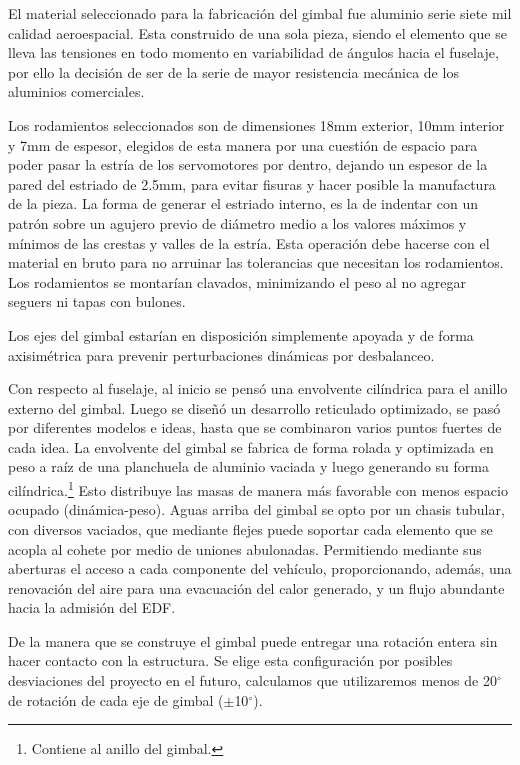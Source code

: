 \medskip

El material seleccionado para la fabricación del gimbal fue aluminio serie siete mil calidad
aeroespacial. Esta construido de una sola pieza, siendo el elemento que se lleva las tensiones
en todo momento en variabilidad de ángulos hacia el fuselaje, por ello la decisión de ser de la
serie de mayor resistencia mecánica de los aluminios comerciales.

\medskip

Los rodamientos seleccionados son de dimensiones 18mm exterior, 10mm interior y 7mm de espesor,
elegidos de esta manera por una cuestión de espacio para poder pasar la estría de los
servomotores por dentro, dejando un espesor de la pared del estriado de 2.5mm,
para evitar fisuras y hacer posible la manufactura de la pieza. La forma de generar el estriado
interno, es la de indentar con un patrón sobre un agujero previo de diámetro medio a los
valores máximos y mínimos de las crestas y valles de la estría. Esta operación debe hacerse con
el material en bruto para no arruinar las tolerancias que necesitan los rodamientos. Los
rodamientos se montarían clavados, minimizando el peso al no agregar seguers ni tapas con
bulones.

\medskip 

Los ejes del gimbal estarían en disposición simplemente apoyada y de forma axisimétrica para prevenir perturbaciones dinámicas por desbalanceo.

\medskip

Con respecto al fuselaje, al inicio se pensó una envolvente cilíndrica para el anillo externo del
gimbal. Luego se diseñó un desarrollo reticulado optimizado, se pasó por diferentes modelos e
ideas, hasta que se combinaron varios puntos fuertes de cada idea. La envolvente del gimbal se fabrica de forma rolada y optimizada en peso a raíz de
una planchuela de aluminio vaciada y luego generando su forma cilíndrica.\footnote{Contiene al
anillo del gimbal.} Esto distribuye las masas de manera más favorable con menos espacio
ocupado (dinámica-peso). Aguas arriba del gimbal se opto por un chasis tubular, con diversos
vaciados, que mediante flejes puede soportar cada elemento que se acopla al cohete por
medio de uniones abulonadas. Permitiendo mediante sus aberturas el acceso a cada
componente del vehículo, proporcionando, además, una renovación del aire para una
evacuación del calor generado, y un flujo abundante hacia la admisión del EDF.

\medskip

De la manera que se construye el gimbal puede entregar una rotación entera sin hacer contacto con la estructura. Se elige esta configuración por posibles desviaciones del proyecto en el
futuro, calculamos que utilizaremos menos de 20$^\circ$ de rotación de cada eje de gimbal ($\pm$10$^\circ$).

